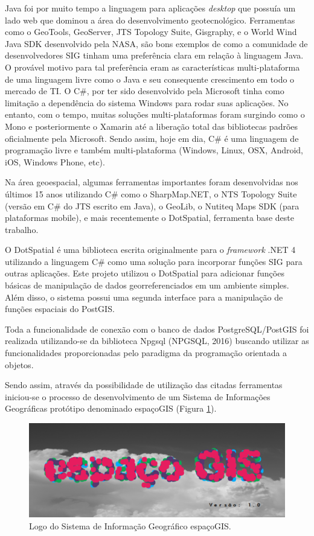 Java foi por muito tempo a linguagem para aplicações \textit{desktop} que possuía um lado web que dominou a área do desenvolvimento geotecnológico. Ferramentas como o GeoTools, GeoServer, JTS Topology Suite, Gisgraphy, e o World Wind Java SDK desenvolvido pela NASA, são bons exemplos de como a comunidade de desenvolvedores SIG tinham uma preferência clara em relação à linguagem Java. O provável motivo para tal preferência eram as características multi-plataforma de uma linguagem livre como o Java e seu consequente crescimento em todo o mercado de TI. O C\#, por ter sido desenvolvido pela Microsoft tinha como limitação a dependência do sistema Windows para rodar suas aplicações. No entanto, com o tempo, muitas soluções multi-plataformas foram surgindo como o Mono e posteriormente o Xamarin até a liberação total das bibliotecas padrões oficialmente pela Microsoft. Sendo assim, hoje em dia, C\# é uma linguagem de programação livre e também multi-plataforma (Windows, Linux, OSX, Android, iOS, Windows Phone, etc). 

Na área geoespacial, algumas ferramentas importantes foram desenvolvidas nos últimos 15 anos utilizando C\# como o SharpMap.NET, o NTS Topology Suite (versão em C\# do JTS escrito em Java), o GeoLib, o Nutiteq Maps SDK (para plataformas mobile), e mais recentemente o DotSpatial, ferramenta base deste trabalho.

O DotSpatial é uma biblioteca escrita originalmente para o \textit{framework} .NET 4 utilizando a linguagem C\# como uma solução para incorporar funções SIG para outras aplicações. Este projeto utilizou o DotSpatial para adicionar funções básicas de manipulação de dados georreferenciados em um ambiente simples. Além disso, o sistema possui uma segunda interface para a manipulação de funções espaciais do PostGIS. 

Toda a funcionalidade de conexão com o banco de dados PostgreSQL/PostGIS foi realizada utilizando-se da biblioteca Npgsql (NPGSQL, 2016) buscando utilizar as funcionalidades proporcionadas pelo paradigma da programação orientada a objetos.

Sendo assim, através da possibilidade de utilização das citadas ferramentas iniciou-se o processo de desenvolvimento de um Sistema de Informações Geográficas protótipo denominado espaçoGIS (Figura \ref{fig:espacogislogo}).

	\begin{figure}
		\centering
		\includegraphics[width=1\linewidth]{data/espacoGIS_logo}
		\caption{Logo do Sistema de Informação Geográfico espaçoGIS.}
		\label{fig:espacogislogo}
	\end{figure}

